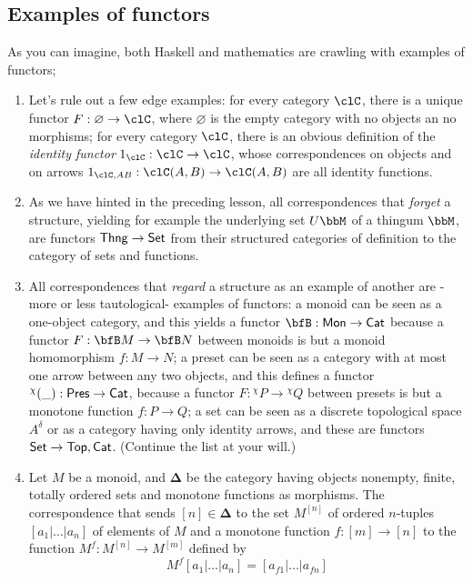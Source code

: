 \documentclass[11pt]{article}
\begin{document}
\subsection{Examples of functors}

As you can imagine, both Haskell and mathematics are crawling with examples of functors;
\begin{example}\leavevmode
	\begin{enumerate}
		\item  Let's rule out a few edge examples: for every category $\clC$, there is a unique functor $F : \varnothing \to \clC$, where $\varnothing$ is the empty category with no objects an no morphisms; for every category $\clC$, there is an obvious definition of the \emph{identity functor} $1_\clC : \clC \to \clC$, whose correspondences on objects and on arrows $1_{\clC, AB} : \clC(A,B) \to \clC(A,B)$ are all identity functions.
		\item  As we have hinted in the preceding lesson, all correspondences that \emph{forget} a structure, yielding for example the underlying set $U\bbM$ of a thingum $\bbM$, are functors ${\sf Thng} \to {\sf Set}$ from their structured categories of definition to the category of sets and functions.
		\item  All correspondences that \emph{regard} a structure as an example of another are -more or less tautological- examples of functors: a monoid can be seen as a one-object category, and this yields a functor $\bfB : {\sf Mon} \to {\sf Cat}$ because a functor $F : \bfB M \to \bfB N$ between monoids is but a monoid homomorphism $f : M \to N$; a preset can be seen as a category with at most one arrow between any two objects, and this defines a functor $^\chi(\_) : {\sf Pres} \to {\sf Cat}$, because a functor $F : {}^\chi P \to {}^\chi Q$ between presets is but a monotone function $f : P \to Q$; a set can be seen as a discrete topological space $A^\delta$ or as a category having only identity arrows, and these are functors ${\sf Set}\to {\sf Top}, {\sf Cat}$. (Continue the list at your will.)
		\item  Let $M$ be a monoid, and $\boldsymbol{\Delta}$ be the category having objects nonempty, finite, totally ordered sets and monotone functions as morphisms. The correspondence that sends $[n]\in\boldsymbol{\Delta}$ to the set $M^{[n]}$ of ordered $n$-tuples $[a_1|\dots|a_n]$ of elements of $M$ and a monotone function $f : [m]\to [n]$ to the function $M^f : M^{[n]}\to M^{[m]}$ defined by
		\[ M^f[a_1|\dots|a_n] = [a_{f1}|\dots|a_{fn}] \]

\end{enumerate}
\end{example}
\end{document}
